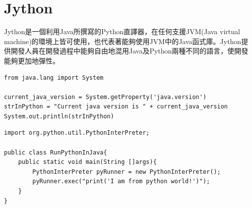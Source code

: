 \newpage
\section{Jython}
\indent
Jython\cite{Jython}是一個利用Java所撰寫的Python直譯器，在任何支援JVM\cite{JVM}(Java virtual machine)的環境上皆可使用，也代表著能夠使用JVM中的Java函式庫。Jython提供開發人員在開發過程中能夠自由地混用Java及Python兩種不同的語言，使開發能夠更加地彈性。

\begin{lstlisting}[caption=Jython於Python語言環境中執行Java之實例, label={l2.4}]
from java.lang import System

current_java_version = System.getProperty('java.version')
strInPython = "Current java version is " + current_java_version
System.out.println(strInPython)
\end{lstlisting}

\begin{lstlisting}[caption=Jython於Java語言環境中執行Python之實例, label={l2.5}]
import org.python.util.PythonInterPreter;

public class RunPythonInJava{
    public static void main(String []args){
        PythonInterPreter pyRunner = new PythonInterPreter();
		pyRunner.exec("print('I am from python world!')");
	}
}
\end{lstlisting}